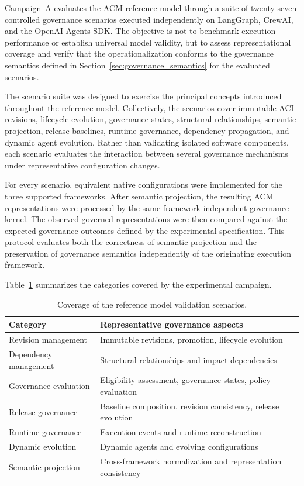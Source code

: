 \documentclass[10pt]{article}
\begin{document}
Campaign~A evaluates the ACM reference model through a suite of twenty-seven controlled governance scenarios executed independently on LangGraph, CrewAI, and the OpenAI Agents SDK. The objective is not to benchmark execution performance or establish universal model validity, but to assess representational coverage and verify that the operationalization conforms to the governance semantics defined in Section~\ref{sec:governance_semantics} for the evaluated scenarios.

The scenario suite was designed to exercise the principal concepts introduced throughout the reference model. Collectively, the scenarios cover immutable ACI revisions, lifecycle evolution, governance states, structural relationships, semantic projection, release baselines, runtime governance, dependency propagation, and dynamic agent evolution. Rather than validating isolated software components, each scenario evaluates the interaction between several governance mechanisms under representative configuration changes.

For every scenario, equivalent native configurations were implemented for the three supported frameworks. After semantic projection, the resulting ACM representations were processed by the same framework-independent governance kernel. The observed governed representations were then compared against the expected governance outcomes defined by the experimental specification. This protocol evaluates both the correctness of semantic projection and the preservation of governance semantics independently of the originating execution framework.

Table~\ref{tab:scenario_categories} summarizes the categories covered by the experimental campaign.

\begin{table}[t]
	\centering
	\caption{Coverage of the reference model validation scenarios.}
	\label{tab:scenario_categories}
	\small
	\begin{tabular}{p{3.2cm}p{3.8cm}}
		\toprule
		\textbf{Category} & \textbf{Representative governance aspects} \\
		\midrule
		Revision management &
		Immutable revisions, promotion, lifecycle evolution \\
		Dependency management &
		Structural relationships and impact dependencies \\
		Governance evaluation &
		Eligibility assessment, governance states, policy evaluation \\
		Release governance &
		Baseline composition, revision consistency, release evolution \\
		Runtime governance &
		Execution events and runtime reconstruction \\
		Dynamic evolution &
		Dynamic agents and evolving configurations \\
		Semantic projection &
		Cross-framework normalization and representation consistency \\
		\bottomrule
	\end{tabular}
\end{table}
\end{document}
